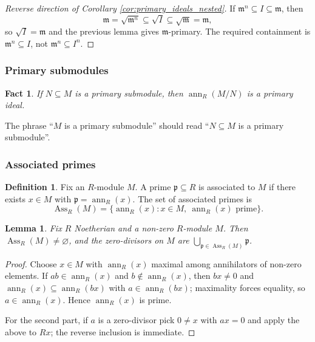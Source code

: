\documentclass[12pt]{article}
\theoremstyle{plain}
\newtheorem{lemma}[thm]{Lemma}
\newtheorem{fact}[thm]{Fact}
\theoremstyle{definition}
\newtheorem{defn}[thm]{Definition} %
\begin{document}
\begin{proof}[Reverse direction of Corollary \ref{cor:primary_ideals_nested}]
If $\mathfrak{m}^n\subseteq I\subseteq\mathfrak{m}$, then
\[
\mathfrak{m}=\sqrt{\mathfrak{m}^n}\subseteq\sqrt{I}\subseteq\sqrt{\mathfrak{m}}=\mathfrak{m},
\]
so $\sqrt{I}=\mathfrak{m}$ and the previous lemma gives $\mathfrak{m}$-primary. The required containment is $\mathfrak{m}^n\subseteq I$, not $\mathfrak{m}^n\subseteq I^n$.
\end{proof}

\subsubsection*{Primary submodules}

\begin{fact}
If $N\subseteq M$ is a primary submodule, then $\operatorname{ann}_R(M/N)$ is a primary ideal.
\end{fact}

The phrase ``$M$ is a primary submodule'' should read ``$N\subseteq M$ is a primary submodule''.

\subsubsection*{Associated primes}

\begin{defn}
Fix an $R$-module $M$. A prime $\mathfrak{p}\subseteq R$ is associated to $M$ if there exists $x\in M$ with $\mathfrak{p}=\operatorname{ann}_R(x)$. The set of associated primes is
\[
\operatorname{Ass}_R(M)=\{\operatorname{ann}_R(x):x\in M,\ \operatorname{ann}_R(x)\text{ prime}\}.
\]
\end{defn}

\begin{lemma}\label{lem:ass_corr}
Fix $R$ Noetherian and a non-zero $R$-module $M$. Then $\operatorname{Ass}_R(M)\ne\varnothing$, and the zero-divisors on $M$ are $\bigcup_{\mathfrak{p}\in\operatorname{Ass}_R(M)}\mathfrak{p}$.
\end{lemma}
\begin{proof}
Choose $x\in M$ with $\operatorname{ann}_R(x)$ maximal among annihilators of non-zero elements. If $ab\in\operatorname{ann}_R(x)$ and $b\notin\operatorname{ann}_R(x)$, then $bx\ne 0$ and $\operatorname{ann}_R(x)\subseteq\operatorname{ann}_R(bx)$ with $a\in\operatorname{ann}_R(bx)$; maximality forces equality, so $a\in\operatorname{ann}_R(x)$. Hence $\operatorname{ann}_R(x)$ is prime.

For the second part, if $a$ is a zero-divisor pick $0\ne x$ with $ax=0$ and apply the above to $Rx$; the reverse inclusion is immediate.
\end{proof}
\end{document}
